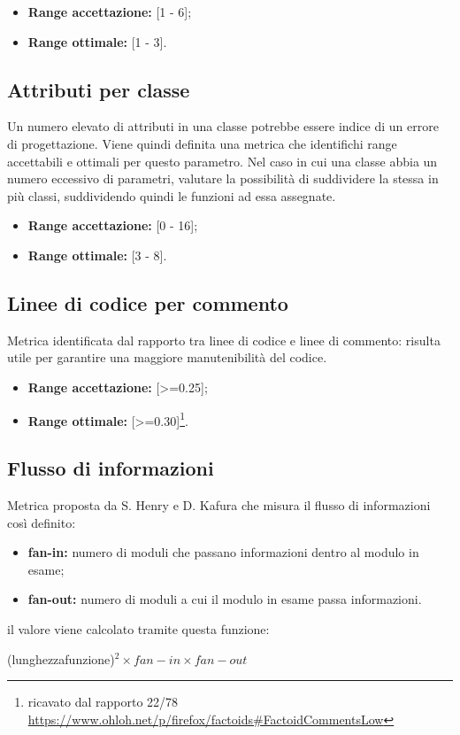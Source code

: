 \begin{itemize}
	\item \textbf{Range accettazione:} [1 - 6];
	\item \textbf{Range ottimale:} [1 - 3].
\end{itemize}  


\subsection{Attributi per classe}
Un numero elevato di attributi in una classe potrebbe essere indice di un errore di progettazione.
Viene quindi definita una metrica che identifichi range accettabili e ottimali per questo parametro.
Nel caso in cui una classe abbia un numero eccessivo di parametri, valutare la possibilità di suddividere la stessa in più classi, suddividendo quindi le funzioni ad essa assegnate.

\begin{itemize}
	\item \textbf{Range accettazione:} [0 - 16];
	\item \textbf{Range ottimale:} [3 - 8].
\end{itemize}  

\subsection{Linee di codice per commento}
Metrica identificata dal rapporto tra linee di codice e linee di commento: risulta utile per garantire una maggiore manutenibilità del codice.

\begin{itemize}
	\item \textbf{Range accettazione:} [>=0.25];
	\item \textbf{Range ottimale:} [>=0.30]\footnote{ricavato dal rapporto 22/78 \url{https://www.ohloh.net/p/firefox/factoids\#FactoidCommentsLow}}.
\end{itemize}  

\subsection{Flusso di informazioni}
Metrica proposta da S. Henry e D. Kafura che misura il flusso di informazioni così definito:

\begin{itemize}
	\item \textbf{fan-in:} numero di moduli che passano informazioni dentro al modulo in esame;
	\item \textbf{fan-out:} numero di moduli a cui il modulo in esame passa informazioni.
\end{itemize} 
il valore viene calcolato tramite questa funzione:
\begin{center}
(lunghezzafunzione)$^2\times fan-in\times fan-out$
\end{center}


